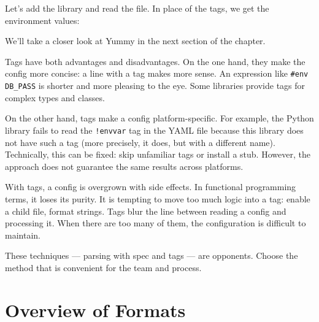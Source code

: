 Let's add the library and read the file. In place of the tags, we get the environment values:

\ifnarrow

\begin{clojure}
(require '[yummy.config :as yummy])

(yummy/load-config
  {:path "config.yaml"})

{:server_port 8080
 :db {:dbtype "mysql"
      :dbname "book"
      :user "ivan"
      :password "*(&fd}A53z#$!"}}
\end{clojure}

\else

\begin{clojure}
(require '[yummy.config :as yummy])

(yummy/load-config {:path "config.yaml"})

{:server_port 8080
 :db {:dbtype "mysql"
      :dbname "book"
      :user "ivan"
      :password "*(&fd}A53z#$!"}}
\end{clojure}

\fi

\noindent
We'll take a closer look at Yummy in the next section of the chapter.

Tags have both advantages and disadvantages. On the one hand, they make the config more concise: a line with a tag makes more sense. An expression like \verb|#env DB_PASS| is shorter and more pleasing to the eye. Some libraries provide tags for complex types and classes.

On the other hand, tags make a config platform-specific. For example, the Python library fails to read the \verb|!envvar| tag in the YAML file because this library does not have such a tag (more precisely, it does, but with a different name). Technically, this can be fixed: skip unfamiliar tags or install a stub. However, the approach does not guarantee the same results across platforms.

With tags, a config is overgrown with side effects. In functional programming terms, it loses its purity. It is tempting to move too much logic into a tag: enable a child file, format strings. Tags blur the line between reading a config and processing it. When there are too many of them, the configuration is difficult to maintain.

These techniques — parsing with spec and tags — are opponents. Choose the method that is convenient for the team and process.

\section{Overview of Formats}

